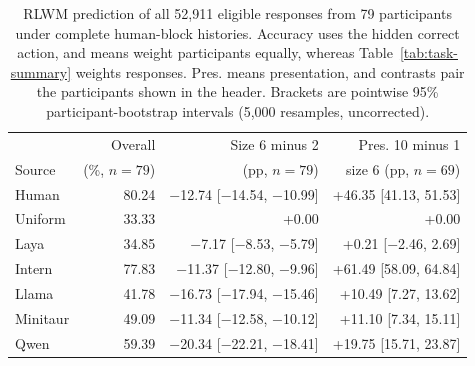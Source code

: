 \documentclass[11pt,a4paper]{article}
\begin{document}
\begin{table}[t]
\centering\scriptsize
\setlength{\tabcolsep}{3pt}
\begin{tabular}{@{}lrrr@{}}
\toprule
 & Overall & Size 6 minus 2 & Pres. 10 minus 1 \\
Source & (\%, $n=79$) & (pp, $n=79$) & size 6 (pp, $n=69$) \\
\midrule
\rowcolor{tablegray} Human & 80.24 & $-$12.74 [$-$14.54, $-$10.99] & +46.35 [41.13, 51.53] \\
\rowcolor{tablegray} Uniform & 33.33 & +0.00 & +0.00 \\
Laya & 34.85 & $-$7.17 [$-$8.53, $-$5.79] & +0.21 [$-$2.46, 2.69] \\
Intern & 77.83 & $-$11.37 [$-$12.80, $-$9.96] & +61.49 [58.09, 64.84] \\
Llama & 41.78 & $-$16.73 [$-$17.94, $-$15.46] & +10.49 [7.27, 13.62] \\
Minitaur & 49.09 & $-$11.34 [$-$12.58, $-$10.12] & +11.10 [7.34, 15.11] \\
Qwen & 59.39 & $-$20.34 [$-$22.21, $-$18.41] & +19.75 [15.71, 23.87] \\
\bottomrule
\end{tabular}
\caption{RLWM prediction of all 52,911 eligible responses from 79 participants under complete human-block histories. Accuracy uses the hidden correct action, and means weight participants equally, whereas Table~\ref{tab:task-summary} weights responses. Pres. means presentation, and contrasts pair the participants shown in the header. Brackets are pointwise 95\% participant-bootstrap intervals (5,000 resamples, uncorrected).}
\label{tab:rlwm-models}
\end{table}
\end{document}
